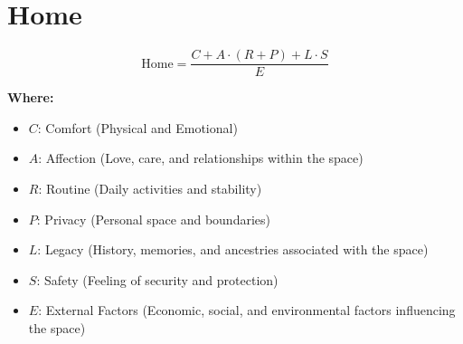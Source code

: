 \chapter{Home}

\begin{equation}
\text{Home} = \frac{C + A \cdot (R + P) + L \cdot S}{E}
\end{equation}

\textbf{Where:}

\begin{itemize}
    \item $C$: Comfort (Physical and Emotional)
    \item $A$: Affection (Love, care, and relationships within the space)
    \item $R$: Routine (Daily activities and stability)
    \item $P$: Privacy (Personal space and boundaries)
    \item $L$: Legacy (History, memories, and ancestries associated with the space)
    \item $S$: Safety (Feeling of security and protection)
    \item $E$: External Factors (Economic, social, and environmental factors influencing the space)
\end{itemize}